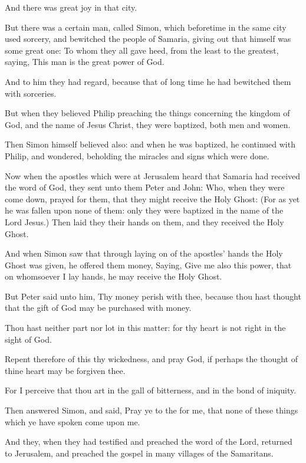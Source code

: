\verse And there was great joy in that city.

\verse But there was a certain man, called Simon, which beforetime in the same city used sorcery, and bewitched the people of Samaria, giving out that himself was some great one: \verse To whom they all gave heed, from the least to the greatest, saying, This man is the great power of God.

\verse And to him they had regard, because that of long time he had bewitched them with sorceries.

\verse But when they believed Philip preaching the things concerning the kingdom of God, and the name of Jesus Christ, they were baptized, both men and women.

\verse Then Simon himself believed also: and when he was baptized, he continued with Philip, and wondered, beholding the miracles and signs which were done.

\verse Now when the apostles which were at Jerusalem heard that Samaria had received the word of God, they sent unto them Peter and John: \verse Who, when they were come down, prayed for them, that they might receive the Holy Ghost: \verse (For as yet he was fallen upon none of them: only they were baptized in the name of the Lord Jesus.)  \verse Then laid they their hands on them, and they received the Holy Ghost.

\verse And when Simon saw that through laying on of the apostles' hands the Holy Ghost was given, he offered them money, \verse Saying, Give me also this power, that on whomsoever I lay hands, he may receive the Holy Ghost.

\verse But Peter said unto him, Thy money perish with thee, because thou hast thought that the gift of God may be purchased with money.

\verse Thou hast neither part nor lot in this matter: for thy heart is not right in the sight of God.

\verse Repent therefore of this thy wickedness, and pray God, if perhaps the thought of thine heart may be forgiven thee.

\verse For I perceive that thou art in the gall of bitterness, and in the bond of iniquity.

\verse Then answered Simon, and said, Pray ye to the \LORD for me, that none of these things which ye have spoken come upon me.

\verse And they, when they had testified and preached the word of the Lord, returned to Jerusalem, and preached the gospel in many villages of the Samaritans.

